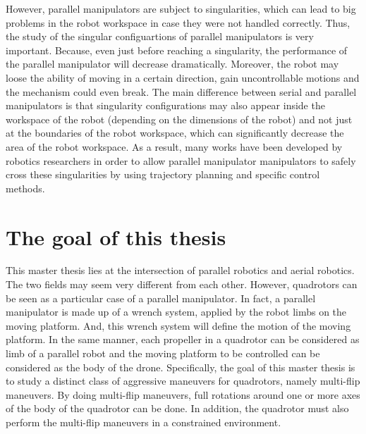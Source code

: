 \documentclass{thesisreport}
\begin{document}
\pagebreak

However, parallel manipulators are subject to singularities, which can lead to big problems in the robot workspace in case they were not handled correctly. Thus, the study of the singular configuartions of parallel manipulators is very important. Because, even just before reaching a singularity, the performance of the parallel manipulator will decrease dramatically. Moreover, the robot may loose the ability of moving in a certain direction, gain uncontrollable motions and the mechanism could even break. The main difference between serial and parallel manipulators is that singularity configurations may also appear inside the workspace of the robot (depending on the dimensions of the robot) and not just at the boundaries of the robot workspace, which can significantly decrease the area of the robot workspace.
As a result, many works have been developed by robotics researchers in order to allow parallel manipulator manipulators to safely cross these singularities by using trajectory planning and specific control methods.

\section*{The goal of this thesis}

This master thesis lies at the intersection of parallel robotics and aerial robotics. The two fields may seem very different from each other. However, quadrotors can be seen as a particular case of a parallel manipulator. 
In fact, a parallel manipulator is made up of a wrench system, applied by the robot limbs on the moving platform. And, this wrench system will define the motion of the moving platform. In the same manner, each propeller in a quadrotor can be considered as limb of a parallel robot and the moving platform to be controlled can be considered as the body of the drone. 
Specifically, the goal of this master thesis is to study a distinct class of aggressive maneuvers for quadrotors, namely multi-flip maneuvers. By doing multi-flip maneuvers, full rotations around one or more axes of the body of the quadrotor can be done. In addition, the quadrotor must also perform the multi-flip maneuvers in a constrained environment.
\end{document}

